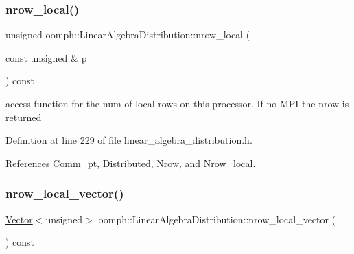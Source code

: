 \mbox{\label{classoomph_1_1LinearAlgebraDistribution_aa58810320f461524a5e1181be3477fe7}} 
\subsubsection{\texorpdfstring{nrow\+\_\+local()}{nrow\_local()}\hspace{0.1cm}{\footnotesize\ttfamily [2/2]}}
{\footnotesize\ttfamily unsigned oomph\+::\+Linear\+Algebra\+Distribution\+::nrow\+\_\+local (\begin{DoxyParamCaption}\item[{const unsigned \&}]{p }\end{DoxyParamCaption}) const\hspace{0.3cm}{\ttfamily [inline]}}



access function for the num of local rows on this processor. If no M\+PI the nrow is returned 



Definition at line 229 of file linear\+\_\+algebra\+\_\+distribution.\+h.



References Comm\+\_\+pt, Distributed, Nrow, and Nrow\+\_\+local.

\mbox{\label{classoomph_1_1LinearAlgebraDistribution_a8d8bc283c4b70295bafe1f5bacebbe64}} 
\subsubsection{\texorpdfstring{nrow\+\_\+local\+\_\+vector()}{nrow\_local\_vector()}}
{\footnotesize\ttfamily \hyperlink{classoomph_1_1Vector}{Vector}$<$unsigned$>$ oomph\+::\+Linear\+Algebra\+Distribution\+::nrow\+\_\+local\+\_\+vector (\begin{DoxyParamCaption}{ }\end{DoxyParamCaption}) const\hspace{0.3cm}{\ttfamily [inline]}}



